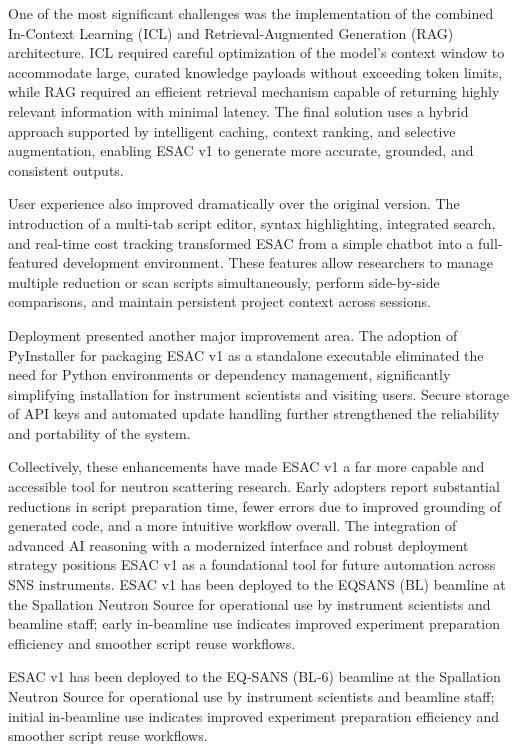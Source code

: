 \documentclass[tm]{ornltm} %
\begin{document}
One of the most significant challenges was the implementation of the combined In-Context Learning (ICL) and Retrieval-Augmented Generation (RAG) architecture. ICL required careful optimization of the model’s context window to accommodate large, curated knowledge payloads without exceeding token limits, while RAG required an efficient retrieval mechanism capable of returning highly relevant information with minimal latency. The final solution uses a hybrid approach supported by intelligent caching, context ranking, and selective augmentation, enabling ESAC v1 to generate more accurate, grounded, and consistent outputs.

User experience also improved dramatically over the original version. The introduction of a multi-tab script editor, syntax highlighting, integrated search, and real-time cost tracking transformed ESAC from a simple chatbot into a full-featured development environment. These features allow researchers to manage multiple reduction or scan scripts simultaneously, perform side-by-side comparisons, and maintain persistent project context across sessions.

Deployment presented another major improvement area. The adoption of PyInstaller for packaging ESAC v1 as a standalone executable eliminated the need for Python environments or dependency management, significantly simplifying installation for instrument scientists and visiting users. Secure storage of API keys and automated update handling further strengthened the reliability and portability of the system.

Collectively, these enhancements have made ESAC v1 a far more capable and accessible tool for neutron scattering research. Early adopters report substantial reductions in script preparation time, fewer errors due to improved grounding of generated code, and a more intuitive workflow overall. The integration of advanced AI reasoning with a modernized interface and robust deployment strategy positions ESAC v1 as a foundational tool for future automation across SNS instruments.
%
ESAC v1 has been deployed to the EQ\textendash SANS (BL) beamline at the Spallation Neutron Source for operational use by instrument scientists and beamline staff; early in‑beamline use indicates improved experiment preparation efficiency and smoother script reuse workflows.

ESAC v1 has been deployed to the EQ‑SANS (BL‑6) beamline at the Spallation Neutron Source for operational use by instrument scientists and beamline staff; initial in‑beamline use indicates improved experiment preparation efficiency and smoother script reuse workflows.
\end{document}
